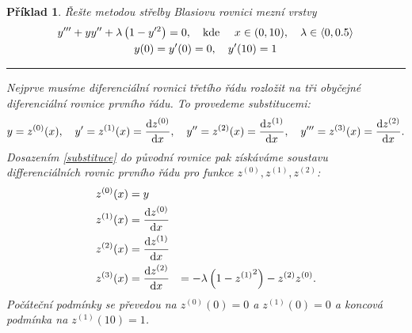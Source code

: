 \documentclass{article}
\newtheorem{example}{Příklad}
\begin{document}
\fontsize{10pt}{15pt}\selectfont
\setcounter{example}{27}
\begin{example}
	Řešte metodou střelby Blasiovu rovnici mezní vrstvy
	\begin{gather*}
		y''' + y y'' + \lambda \left( 1 - y'^{2} \right)  = 0,
		\qq{kde } x \in (0,10) \qcomma \lambda \in \langle 0, 0.5 \rangle \\
		y(0) = y'(0) = 0 \qcomma y'(10) = 1
	\end{gather*}
	\smallskip
	\hrule
	\medskip
	Nejprve musíme diferenciální rovnici třetího řádu rozložit na tři obyčejné diferenciální rovnice prvního řádu. To provedeme substitucemi:
	\begin{equation}
		\label{substituce}
		y = z^{(0)}(x) \qcomma
		y' = z^{(1)}(x) = \dv{z^{(0)}}{x} \qcomma
		y'' = z^{(2)}(x) = \dv{z^{(1)}}{x} \qcomma
		y''' = z^{(3)}(x) = \dv{z^{(2)}}{x}.
	\end{equation}
	Dosazením \ref{substituce} do původní rovnice pak získáváme soustavu differenciálních rovnic prvního řádu pro funkce $z^{(0)}, z^{(1)}, z^{(2)}$:
	\begin{equation}
		\begin{aligned}
			z^{(0)}(x) & = y                                                                                   \\
			z^{(1)}(x) & = \dv{z^{(0)}}{x}                                                                     \\
			z^{(2)}(x) & = \dv{z^{(1)}}{x}                                                                     \\
			z^{(3)}(x) & = \dv{z^{(2)}}{x}(x) & = -\lambda \left( 1 - {z^{(1)}}^{2} \right)  - z^{(2)}z^{(0)}.
		\end{aligned}
	\end{equation}
	Počáteční podmínky se převedou na $z^{(0)}(0) = 0$ a $z^{(1)}(0) = 0$ a koncová podmínka na $z^{(1)}(10) = 1$.

	\medskip


\end{example}
\end{document}
